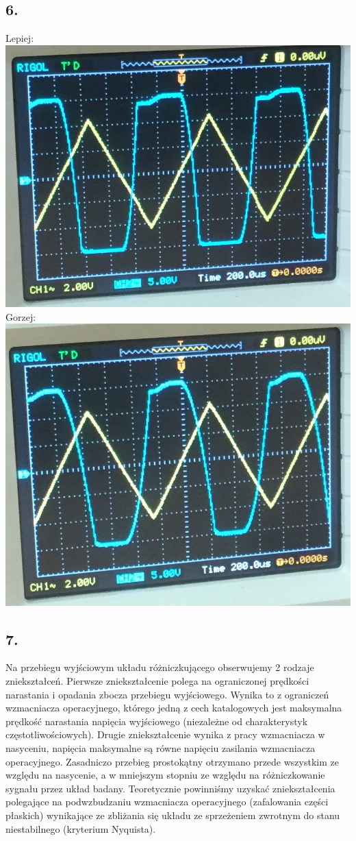 \documentclass[polish,a4paper]{article}
\begin{document}
\subsection*{6.}
Lepiej: \includegraphics[scale=0.5]{lepiej}\\
Gorzej: \includegraphics[scale=0.5]{gorzej}
\subsection*{7.}
Na przebiegu wyjściowym układu różniczkującego obserwujemy 2 rodzaje zniekształceń. Pierwsze zniekształcenie polega na ograniczonej prędkości narastania i opadania zbocza przebiegu wyjściowego. Wynika to z ograniczeń wzmacniacza operacyjnego, którego jedną z cech katalogowych jest maksymalna prędkość narastania napięcia wyjściowego (niezależne od charakterystyk częstotliwościowych). Drugie zniekształcenie wynika z pracy wzmacniacza w nasyceniu, napięcia maksymalne są równe napięciu zasilania wzmacniacza operacyjnego. Zasadniczo przebieg prostokątny otrzymano przede wszystkim ze względu na nasycenie, a w mniejszym stopniu ze względu na różniczkowanie sygnału przez układ badany.
Teoretycznie powinniśmy uzyskać zniekształcenia polegające na podwzbudzaniu wzmacniacza operacyjnego (zafalowania części płaskich) wynikające ze zbliżania się układu ze sprzeżeniem zwrotnym do stanu niestabilnego (kryterium Nyquista).
\end{document}
